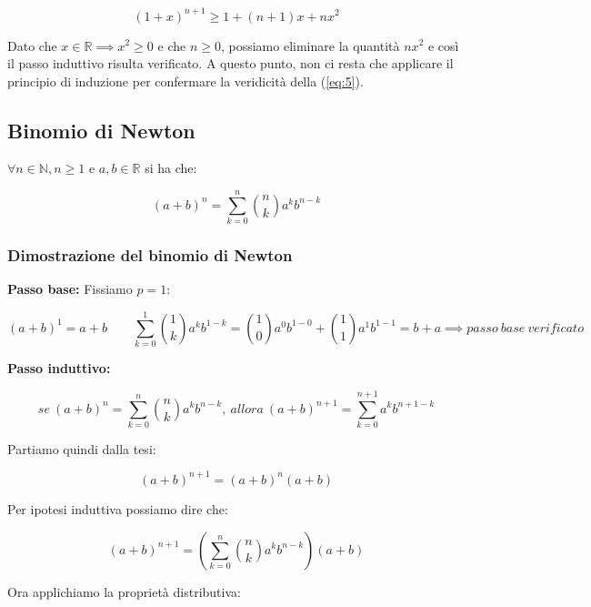 \documentclass{article}
\begin{document}
\begin{equation*}
    (1+x)^{n+1} \geq 1 + (n + 1)x + nx^2
\end{equation*}

\noindent Dato che $x \in \mathbb{R} \implies x^2 \geq 0$ e che $n \geq 0$, possiamo eliminare la quantità $nx^2$ e così il passo induttivo risulta verificato. A questo punto, non ci resta che applicare il principio di induzione per confermare la veridicità della (\ref{eq:5}).

\subsection{Binomio di Newton}
$\forall n \in \mathbb{N}, n \geq 1$ e $a, b \in \mathbb{R}$ si ha che:

\begin{equation}
    (a + b)^n = \sum_{k=0}^n \binom{n}{k} a^k b^{n-k}
    \label{eq:6}
\end{equation}

\subsubsection{Dimostrazione del binomio di Newton}
\noindent\textbf{Passo base:} Fissiamo $p = 1$: 

\begin{equation*}
    (a + b)^1 = a + b \qquad \sum_{k=0}^1 \binom{1}{k}a^k b^{1-k}=\binom{1}{0}a^0b^{1-0} + \binom{1}{1}a^1b^{1-1} = b+a \implies passo \ base \ verificato
\end{equation*}

\noindent\textbf{Passo induttivo:} 

\begin{equation*}
    se \ (a + b)^n = \sum_{k=0}^n \binom{n}{k} a^k b^{n-k}, \ allora \ (a+b)^{n+1} = \sum_{k=0}^{n+1} a^{k}b^{n+1-k}
\end{equation*}

\noindent Partiamo quindi dalla tesi:

\begin{equation*}
    (a+b)^{n+1} = (a + b)^n (a + b)
\end{equation*}

\noindent Per ipotesi induttiva possiamo dire che:

\begin{equation*}
    (a+b)^{n+1} = \left(\sum_{k=0}^n \binom{n}{k} a^k b^{n-k}\right)(a+b)
\end{equation*}

\noindent Ora applichiamo la proprietà distributiva:
\end{document}
